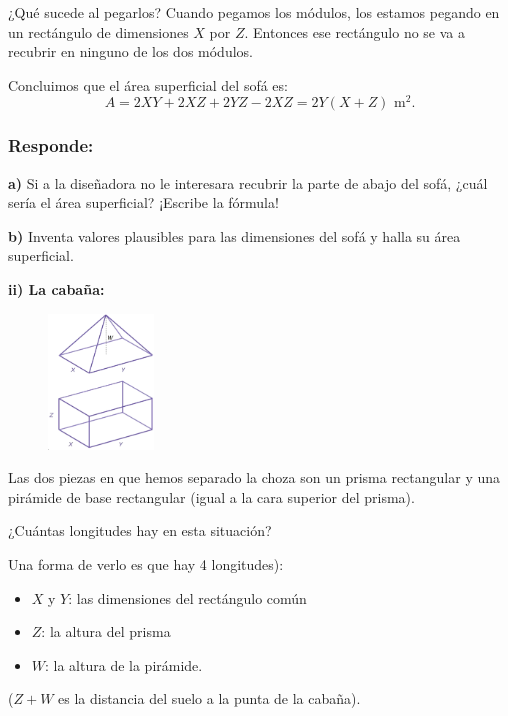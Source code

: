 \documentclass[12pt,a4paper]{article}
\begin{document}
¿Qué sucede al pegarlos? Cuando pegamos los módulos, los estamos pegando en un rectángulo de dimensiones $X$ por $Z$. Entonces ese rectángulo no se va a recubrir en ninguno de los dos módulos.

Concluimos que el área superficial del sofá es:
$$A = 2XY + 2XZ + 2YZ - 2XZ = 2Y(X + Z) \text{ m}^2.$$

\subsubsection*{Responde:}

\textbf{a)} Si a la diseñadora no le interesara recubrir la parte de abajo del sofá, ¿cuál sería el área superficial? ¡Escribe la fórmula!

\textbf{b)} Inventa valores plausibles para las dimensiones del sofá y halla su área superficial.

\vspace{4mm}


\textbf{ii) La cabaña:}

\begin{figure}
\centering
\includegraphics[width=0.25\textwidth]{Figuras/fig68.png}
\end{figure}

Las dos piezas en que hemos separado la choza son un prisma rectangular y una pirámide de base rectangular (igual a la cara superior del prisma).

¿Cuántas longitudes hay en esta situación?

Una forma de verlo es que hay 4 longitudes):
\begin{itemize}[nosep]
    \item $X$ y $Y$: las dimensiones del rectángulo común
    \item $Z$: la altura del prisma
    \item $W$: la altura de la pirámide.
\end{itemize}

($Z + W$ es la distancia del suelo a la punta de la cabaña).
\end{document}
